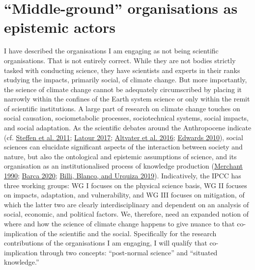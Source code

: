 \documentclass[a4paper, nobind]{templates/ociamthesis}
\begin{document}
\hypertarget{middle-ground-organisations-as-epistemic-actors}{%
\section{``Middle-ground'' organisations as epistemic actors}\label{middle-ground-organisations-as-epistemic-actors}}

I have described the organisations I am engaging as not being scientific organisations. That is not entirely correct. While they are not bodies strictly tasked with conducting science, they have scientists and experts in their ranks studying the impacts, primarily social, of climate change. But more importantly, the science of climate change cannot be adequately circumscribed by placing it narrowly within the confines of the Earth system science or only within the remit of scientific institutions. A large part of research on climate change touches on social causation, sociometabolic processes, sociotechnical systems, social impacts, and social adaptation. As the scientific debates around the Anthropocene indicate (cf. \protect\hyperlink{ref-steffen_anthropocene_2011}{Steffen et al. 2011}; \protect\hyperlink{ref-latour_facing_2017}{Latour 2017}; \protect\hyperlink{ref-altvater_anthropocene_2016}{Altvater et al. 2016}; \protect\hyperlink{ref-edwards_vast_2010}{Edwards 2010}), social sciences can elucidate significant aspects of the interaction between society and nature, but also the ontological and epistemic assumptions of science, and its organisation as an institutionalised process of knowledge production (\protect\hyperlink{ref-merchant_death_1990}{Merchant 1990}; \protect\hyperlink{ref-barca_forces_2020}{Barca 2020}; \protect\hyperlink{ref-billi_what_2019}{Billi, Blanco, and Urquiza 2019}). Indicatively, the IPCC has three working groups: WG I focuses on the physical science basis, WG II focuses on impacts, adaptation, and vulnerability, and WG III focuses on mitigation, of which the latter two are clearly interdisciplinary and dependent on an analysis of social, economic, and political factors. We, therefore, need an expanded notion of where and how the science of climate change happens to give nuance to that co-implication of the scientific and the social. Specifically for the research contributions of the organisations I am engaging, I will qualify that co-implication through two concepts: ``post-normal science'' and ``situated knowledge.''
\end{document}
